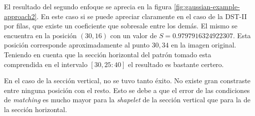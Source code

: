 El resultado del segundo enfoque se aprecia en la figura \ref{fig:gaussian-example-approach2}.
En este caso si se puede apreciar claramente en el caso de la DST-II por filas, que existe un coeficiente que sobresale
entre los demás. El mismo se encuentra en la posición $(30,16)$ con un valor de $S=0.9797916324922307$.
Esta posición corresponde aproximadamente al punto $30,34$ en la imagen original. Teniendo en cuenta que la
sección horizontal del patrón tomado esta comprendida en el intervalo $[30,25:40]$ el resultado es bastante certero.

En el caso de la sección vertical, no se tuvo tanto éxito. No existe gran constraste entre ninguna posición con el resto. 
Esto se debe a que el error de las condiciones de \textit{matching} es mucho mayor para la \textit{shapelet} de la sección
vertical que para la de la sección horizontal.

